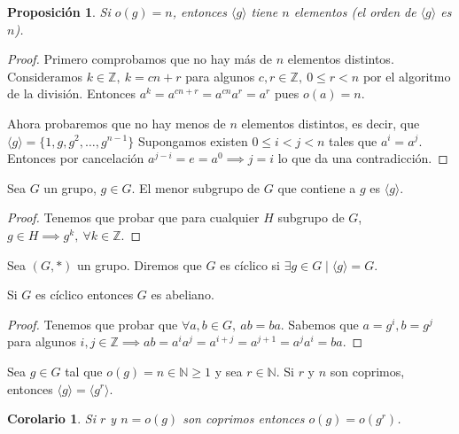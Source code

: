\documentclass{book}
\newtheorem*{cor}{Corolario}
\newtheorem{pro}{Proposición}
\theoremstyle{definition}
\theoremstyle{remark}
\newcommand{\N}{\mathbb{N}}
\newcommand{\Z}{\mathbb{Z}}
\begin{document}
\begin{pro}
	Si $o(g) = n$, entonces $\langle g \rangle$ tiene $n$ elementos (el orden de $\langle g \rangle$ es $n$).
\end{pro}

\begin{proof}
	Primero comprobamos que no hay más de $n$ elementos distintos. Consideramos $k \in \Z,\ k = cn + r$ para algunos $c, r \in \Z,\ 0 \leq r < n$ por el algoritmo de la división. Entonces $a^k = a^{cn + r} = a^{cn} a^{r} = a^{r}$ pues $o(a) = n$.
	
	Ahora probaremos que no hay menos de $n$ elementos distintos, es decir, que $\langle g \rangle = \{1, g, g^2, \dots, g^{n-1}\}$ Supongamos existen $0 \leq i < j < n$ tales que $a^i = a^j$. Entonces por cancelación $a^{j - i} = e = a^0 \implies j = i$ lo que da una contradicción.
\end{proof}

\begin{thm}
	Sea $G$ un grupo, $g \in G$. El menor subgrupo de $G$ que contiene a $g$ es $\langle g \rangle$.
\end{thm}

\begin{proof}
	Tenemos que probar que para cualquier $H$ subgrupo de $G$, $g \in H \implies g^k,\ \forall k \in \Z$.
\end{proof}

\begin{dfn}
	Sea $(G, \ast)$ un grupo. Diremos que $G$ es cíclico si $\exists g \in G \mid \langle g \rangle = G$.
\end{dfn}

\begin{thm}
	\label{thm:ciclicoimplicaabeliano}
	Si $G$ es cíclico entonces $G$ es abeliano.
\end{thm}

\begin{proof}
	Tenemos que probar que $\forall a,b \in G,\ ab = ba$. Sabemos que $a = g^i, b = g^j$ para algunos $i, j \in \Z \implies ab = a^i a^j = a^{i+j} = a^{j+1} = a^j a^i = ba$.
\end{proof}


\begin{thm}
	\label{thm:coprimosgeneradosiguales}
	Sea $g \in G$ tal que $o(g) = n \in \N \geq 1$ y sea $r \in \N$. Si $r$ y $n$ son coprimos, entonces $\langle g \rangle = \langle g^r \rangle$.
\end{thm}

\begin{cor}
	Si $r$ y $n = o(g)$ son coprimos entonces $o(g) = o(g^r)$.
\end{cor}
\end{document}
